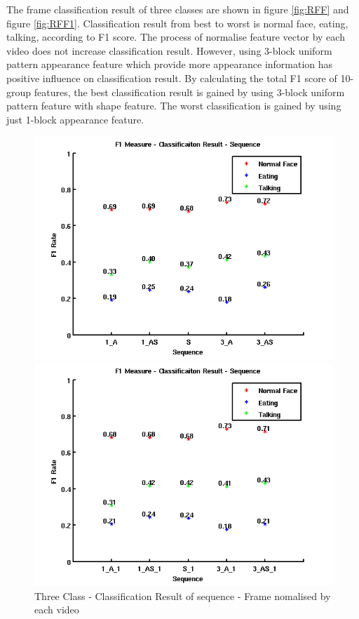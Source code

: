The frame classification result of three classes are shown in figure \ref{fig:RFF} and figure \ref{fig:RFF1}. Classification result from best to worst is normal face, eating, talking, according to F1 score. The process of normalise feature vector by each video does not increase classification result. However, using 3-block uniform pattern appearance feature which provide more appearance information has positive influence on classification result. By calculating the total F1 score of 10-group features, the best classification result is gained by using 3-block uniform pattern feature with shape feature. The worst classification is gained by using just 1-block appearance feature.
\begin{figure}[ht]
\centering
\begin{minipage}{.5\textwidth}
  \centering
  \captionsetup{justification=centering, margin=1cm}
  \includegraphics[width=\linewidth]{imgs/Result_F1_Sequence.png}
  \caption{Three Class - Classification Result of sequence - Frame nomalised by each video}
  \label{fig:RFS}
\end{minipage}%
\begin{minipage}{.5\textwidth}
  \centering
  \captionsetup{justification=centering, margin=1cm}
  \includegraphics[width=\linewidth]{imgs/Result_F1_Sequence_1.png}

\end{minipage}
\end{figure}
